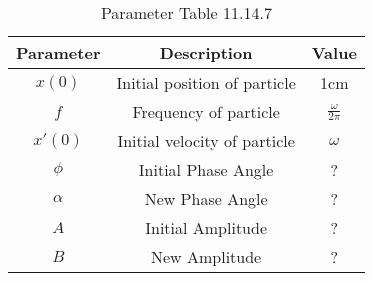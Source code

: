 
\begin{table}[h]
  \centering
  \begin{tabular}{|c|c|c|}
    \hline
Parameter & Description & Value \\ \hline
$x(0)$ & Initial position of particle & 1cm\\ \hline
$f$ & Frequency of particle & $\frac{\omega}{2\pi}$ \\ \hline
$x'(0)$ & Initial velocity of particle & $\omega$ \\ \hline
$\phi$ & Initial Phase Angle & ?\\
\hline
$\alpha$ & New Phase Angle & ?\\
\hline
$A$ & Initial Amplitude & ?\\
\hline
$B$ & New Amplitude & ?\\
\hline
  \end{tabular}
  \vspace{2mm}
  \caption{Parameter Table 11.14.7}
\end{table}

